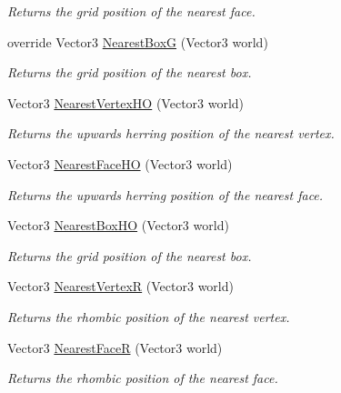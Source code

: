 \begin{DoxyCompactItemize}
\begin{DoxyCompactList}\small\item\em Returns the grid position of the nearest face.\end{DoxyCompactList}\item 
override Vector3 \hyperlink{class_g_f_hex_grid_ab038b99bc1bedfcdee8a0736c4ed1a1e_ab038b99bc1bedfcdee8a0736c4ed1a1e}{Nearest\+Box\+G} (Vector3 world)
\begin{DoxyCompactList}\small\item\em Returns the grid position of the nearest box.\end{DoxyCompactList}\item 
Vector3 \hyperlink{class_g_f_hex_grid_a62d5c4c11737bc2bb81275e7b601773c_a62d5c4c11737bc2bb81275e7b601773c}{Nearest\+Vertex\+H\+O} (Vector3 world)
\begin{DoxyCompactList}\small\item\em Returns the upwards herring position of the nearest vertex.\end{DoxyCompactList}\item 
Vector3 \hyperlink{class_g_f_hex_grid_a23a792a9788102c3af99a5de5b61a982_a23a792a9788102c3af99a5de5b61a982}{Nearest\+Face\+H\+O} (Vector3 world)
\begin{DoxyCompactList}\small\item\em Returns the upwards herring position of the nearest face.\end{DoxyCompactList}\item 
Vector3 \hyperlink{class_g_f_hex_grid_a37ab0165e6b0dba047a7493e5862912d_a37ab0165e6b0dba047a7493e5862912d}{Nearest\+Box\+H\+O} (Vector3 world)
\begin{DoxyCompactList}\small\item\em Returns the grid position of the nearest box.\end{DoxyCompactList}\item 
Vector3 \hyperlink{class_g_f_hex_grid_a1a6a188b62d970eb084eb0907ad5d16e_a1a6a188b62d970eb084eb0907ad5d16e}{Nearest\+Vertex\+R} (Vector3 world)
\begin{DoxyCompactList}\small\item\em Returns the rhombic position of the nearest vertex.\end{DoxyCompactList}\item 
Vector3 \hyperlink{class_g_f_hex_grid_a2cf1f2642ac2dea0058fee159ea7e78b_a2cf1f2642ac2dea0058fee159ea7e78b}{Nearest\+Face\+R} (Vector3 world)
\begin{DoxyCompactList}\small\item\em Returns the rhombic position of the nearest face.\end{DoxyCompactList}\item 

\end{DoxyCompactItemize}
